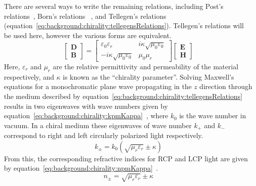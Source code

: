 There are several ways to write the remaining relations, including Post's relations~\cite{Capolino2009}, Born's relations~\cite{Lekner1999, Barnett2016} , and Tellegen's relations~\cite{Capolino2009,kong1986,lindell1994} (equation~\ref{eq:background:chirality:tellegensRelations}). Tellegen's relations will be used here, however the various forms are equivalent.
\begin{equation}\label{eq:background:chirality:tellegensRelations}
    \begin{bmatrix}
        \mathbf{D} \\
        \mathbf{B}
    \end{bmatrix}
    =
    \begin{bmatrix}
        \varepsilon_0 \varepsilon_r & i \kappa \sqrt{\mu_0 \varepsilon_0} \\
        -i \kappa \sqrt{\mu_0 \varepsilon_0} & \mu_0 \mu_r
    \end{bmatrix}
    \begin{bmatrix}
        \mathbf{E} \\
        \mathbf{H}
    \end{bmatrix}
\end{equation}
Here, ${{\varepsilon }_{r}}$ and $\mu_r$ are the relative permittivity and permeability of the material respectively, and $\kappa$ is known as the ``chirality parameter''. Solving Maxwell's equations for a monochromatic plane wave propagating in the $z$ direction through the medium described by equation~\ref{eq:background:chirality:tellegensRelations} results in two eigenwaves with wave numbers given by equation~\ref{eq:background:chirality:kpmKappa}~\cite{Wang2014a, Qiu2008}, where $k_0$ is the wave number in vacuum. In a chiral medium these eigenwaves of wave number ${{k}_{+}}$ and ${{k}_{-}}$ correspond to right and left circularly polarized light respectively.
\begin{equation}\label{eq:background:chirality:kpmKappa}
    {k_\pm } = {k_0}\left( {\sqrt {{\mu _r}{\varepsilon _r}}  \pm \kappa } \right)
\end{equation}
From this, the corresponding refractive indices for RCP and LCP light are given by equation~\ref{eq:background:chirality:npmKappa}~\cite{Capolino2009, Qiu2008, Valev2013b}. 
\begin{equation}\label{eq:background:chirality:npmKappa}
    {n_ \pm } = \sqrt {{\mu _r}{\varepsilon _r}}  \pm \kappa
\end{equation}

